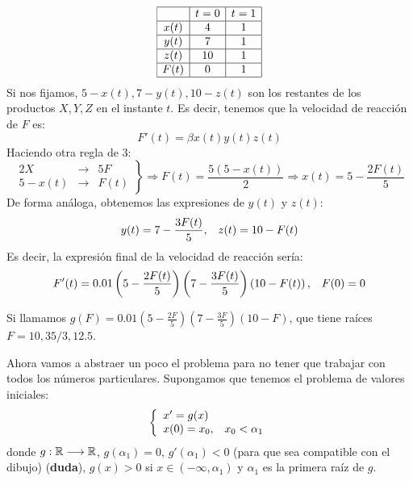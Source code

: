 \begin{example}
\[
\begin{array}{|c|c|c|}
\hline
& t=0 & t=1 \\
\hline
x(t) & 4 & 1\\
\hline
y(t) & 7 & 1\\
\hline
z(t) & 10 & 1\\
\hline
F(t) & 0 & 1\\
\hline
\end{array}
\]
Si nos fijamos, $5-x(t),7-y(t),10-z(t)$ son los restantes de los productos $X,Y,Z$ en el instante $t$. Es decir, tenemos que la velocidad de reacción de $F$ es:
\[
F'(t)=\beta x(t)y(t)z(t)
\]
Haciendo otra regla de 3:
\[
\left.
\begin{array}{ccc}
2X & \longrightarrow & 5F\\
5-x(t) & \longrightarrow & F(t)
\end{array}
\right\} \Rightarrow F(t)=\frac{5(5-x(t))}{2} \Rightarrow x(t)=5-\frac{2F(t)}{5}
\]
De forma análoga, obtenemos las expresiones de $y(t)$ y $z(t)$:
\[
y(t)=7-\frac{3F(t)}{5}, \;\;\; z(t)=10-F(t)
\]
Es decir, la expresión final de la velocidad de reacción sería:
\[
F'(t)=0.01\left(5-\frac{2F(t)}{5}\right)\left(7-\frac{3F(t)}{5}\right)\left(10-F(t)\right), \;\;\; F(0)=0
\]

Si llamamos $g(F)=0.01\left(5-\frac{2F}{5}\right)\left(7-\frac{3F}{5}\right)\left(10-F\right)$, que tiene raíces $F=10,35/3,12.5$. 

\begin{center}
\end{center}

Ahora vamos a abstraer un poco el problema para no tener que trabajar con todos los números particulares. Supongamos que tenemos el problema de valores iniciales:
\[
\left\{
\begin{array}{l}
x'=g(x) \\
x(0)=x_0, \;\;\; x_0<\alpha_1
\end{array}
\right.
\]
donde $g : \mathbb{R} \longrightarrow \mathbb{R}$, $g(\alpha_1)=0$, $g'(\alpha_1)<0$ (para que sea compatible con el dibujo) (\textbf{duda}), $g(x)>0$ si $x\in(-\infty, \alpha_1)$ y $\alpha_1$ es la primera raíz de $g$. 


\end{example}
